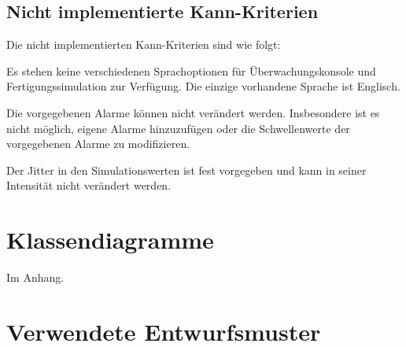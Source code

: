 \documentclass[parskip=full]{scrartcl}
\begin{document}
\subsection{Nicht implementierte Kann-Kriterien}
Die nicht implementierten Kann-Kriterien sind wie folgt:

Es stehen keine verschiedenen Sprachoptionen f\"ur \"Uberwachungskonsole und Fertigungssimulation zur Verf\"ugung. Die einzige
vorhandene Sprache ist Englisch.

Die vorgegebenen Alarme k\"onnen nicht ver\"andert werden. Insbesondere ist es nicht m\"oglich, eigene Alarme hinzuzuf\"ugen
oder die Schwellenwerte der vorgegebenen Alarme zu modifizieren.

Der Jitter in den Simulationswerten ist fest vorgegeben und kann in seiner Intensit\"at nicht ver\"andert werden.

\section{Klassendiagramme}
Im Anhang.

\section{Verwendete Entwurfsmuster}
\end{document}
